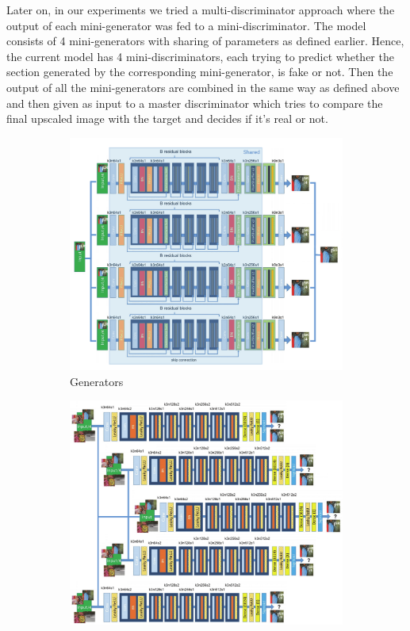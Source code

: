 \documentclass[12pt,a4paper,twocolumn]{article}
\begin{document}
        Later on, in our experiments we tried a multi-discriminator approach where the output of each mini-generator was fed to a mini-discriminator.
        The model consists of 4 mini-generators with sharing of parameters as defined earlier.
        Hence, the current model has 4 mini-discriminators, each trying to predict whether the section generated by the corresponding mini-generator, is fake or not.
        Then the output of all the mini-generators are combined in the same way as defined above and then given as input to a master discriminator which tries to compare the final upscaled image with the target and decides if it's real or not.

        \begin{figure}
            \centering
            \begin{subfigure}{0.4\textwidth}
                \includegraphics[width=\textwidth]{images/mad-srgan-gen-arch.png}
                \caption{Generators}
            \end{subfigure}
            \begin{subfigure}{0.4\textwidth}
                \includegraphics[width=\textwidth]{images/mad-srgan-disc-arch.png}

\end{subfigure}
\end{figure}
\end{document}
